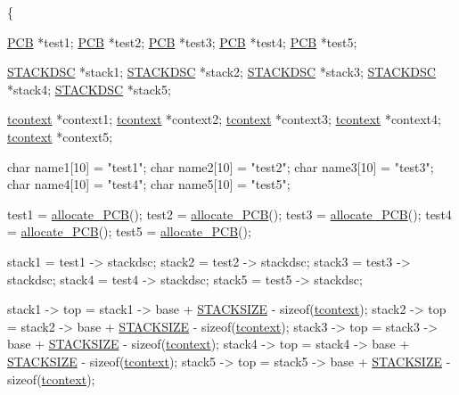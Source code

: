 \begin{DoxyCode}
                                         \{
        
        
        \hyperlink{structprocess}{PCB} *test1;
        \hyperlink{structprocess}{PCB} *test2;
        \hyperlink{structprocess}{PCB} *test3;
        \hyperlink{structprocess}{PCB} *test4;
        \hyperlink{structprocess}{PCB} *test5;
        
        \hyperlink{structstack}{STACKDSC} *stack1;
        \hyperlink{structstack}{STACKDSC} *stack2;
        \hyperlink{structstack}{STACKDSC} *stack3;
        \hyperlink{structstack}{STACKDSC} *stack4;
        \hyperlink{structstack}{STACKDSC} *stack5;
        
        \hyperlink{structcontext}{tcontext} *context1;
        \hyperlink{structcontext}{tcontext} *context2;
        \hyperlink{structcontext}{tcontext} *context3;
        \hyperlink{structcontext}{tcontext} *context4;
        \hyperlink{structcontext}{tcontext} *context5;
        
        \textcolor{keywordtype}{char} name1[10] = \textcolor{stringliteral}{"test1"};
        \textcolor{keywordtype}{char} name2[10] = \textcolor{stringliteral}{"test2"};
        \textcolor{keywordtype}{char} name3[10] = \textcolor{stringliteral}{"test3"};
        \textcolor{keywordtype}{char} name4[10] = \textcolor{stringliteral}{"test4"};
        \textcolor{keywordtype}{char} name5[10] = \textcolor{stringliteral}{"test5"};
        
        
        
        test1 = \hyperlink{mpx__r2_8c_a58a8a1ea0a96b9ecf0be29179a5a0a1e}{allocate_PCB}();
        test2 = \hyperlink{mpx__r2_8c_a58a8a1ea0a96b9ecf0be29179a5a0a1e}{allocate_PCB}();
        test3 = \hyperlink{mpx__r2_8c_a58a8a1ea0a96b9ecf0be29179a5a0a1e}{allocate_PCB}();
        test4 = \hyperlink{mpx__r2_8c_a58a8a1ea0a96b9ecf0be29179a5a0a1e}{allocate_PCB}();
        test5 = \hyperlink{mpx__r2_8c_a58a8a1ea0a96b9ecf0be29179a5a0a1e}{allocate_PCB}();
        
        stack1 = test1 -> stackdsc;
        stack2 = test2 -> stackdsc;
        stack3 = test3 -> stackdsc;
        stack4 = test4 -> stackdsc;
        stack5 = test5 -> stackdsc;
        
        stack1 -> top = stack1 -> base + \hyperlink{mpx__r2_8h_a21d9543c516fffee84a7963224271f95}{STACKSIZE} - \textcolor{keyword}{sizeof}(\hyperlink{structcontext}{tcontext});
        stack2 -> top = stack2 -> base + \hyperlink{mpx__r2_8h_a21d9543c516fffee84a7963224271f95}{STACKSIZE} - \textcolor{keyword}{sizeof}(\hyperlink{structcontext}{tcontext});
        stack3 -> top = stack3 -> base + \hyperlink{mpx__r2_8h_a21d9543c516fffee84a7963224271f95}{STACKSIZE} - \textcolor{keyword}{sizeof}(\hyperlink{structcontext}{tcontext});
        stack4 -> top = stack4 -> base + \hyperlink{mpx__r2_8h_a21d9543c516fffee84a7963224271f95}{STACKSIZE} - \textcolor{keyword}{sizeof}(\hyperlink{structcontext}{tcontext});
        stack5 -> top = stack5 -> base + \hyperlink{mpx__r2_8h_a21d9543c516fffee84a7963224271f95}{STACKSIZE} - \textcolor{keyword}{sizeof}(\hyperlink{structcontext}{tcontext}); 
        

\end{DoxyCode}
